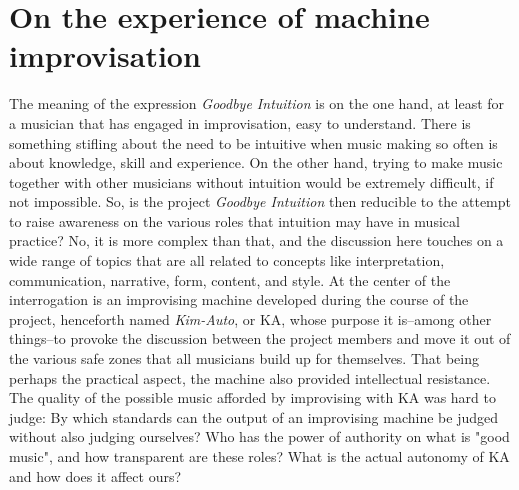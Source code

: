 \documentclass[11pt]{article}
\begin{document}
\section*{On the experience of machine improvisation}
\label{sec:org5be1141}
The meaning of the expression \emph{Goodbye Intuition} is on the one hand, at least for a musician that has engaged in improvisation, easy to understand. There is something stifling about the need to be intuitive when music making so often is about knowledge, skill and experience. On the other hand, trying to make music together with other musicians without intuition would be extremely difficult, if not impossible. So, is the project \emph{Goodbye Intuition} then reducible to the attempt to raise awareness on the various roles that intuition may have in musical practice? No, it is more complex than that, and the discussion here touches on a wide range of topics that are all related to concepts like interpretation, communication, narrative, form, content, and style. At the center of the interrogation is an improvising machine developed during the course of the project, henceforth named \emph{Kim-Auto}, or KA, whose purpose it is--among other things--to provoke the discussion between the project members and move it out of the various safe zones that all musicians build up for themselves. That being perhaps the practical aspect, the machine also provided intellectual resistance. The quality of the possible music afforded by improvising with KA was hard to judge: By which standards can the output of an improvising machine be judged without also judging ourselves? Who has the power of authority on what is "good music", and how transparent are these roles? What is the actual autonomy of KA and how does it affect ours?
\end{document}
